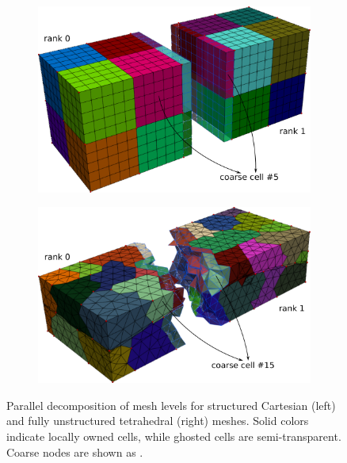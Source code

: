 \begin{figure} [htbp]
\begin{subfigure}[t]{0.45\textwidth}
  \centerline{\includegraphics[width=\linewidth]{figs/Cube_parallel_part}}
  \caption{\label{fig:par_decomp_struct}}
\end{subfigure}
\hfill
\begin{subfigure}[t]{0.45\textwidth}
  \centerline{\includegraphics[width=\linewidth]{figs/MazuModel2_parallel_part}}
  \caption{\label{fig:par_decomp_unstruct}}
\end{subfigure}
\caption[Parallel decomposition of multiscale mesh levels]{\label{fig:par_decomp} Parallel decomposition of mesh levels for structured Cartesian (left) and fully unstructured tetrahedral (right) meshes.   Solid colors indicate locally owned cells, while ghosted cells are semi-transparent.   Coarse nodes are shown as .}
\end{figure}

